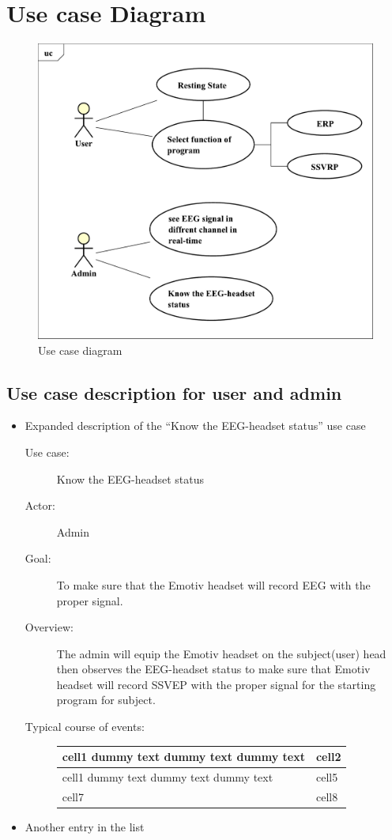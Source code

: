 \section{Use case Diagram}
\begin{figure}[ht]
	\centering
	\includegraphics[scale = 0.5]{chapter4/uc.pdf}
	\caption{Use case diagram}
\end{figure}

\newpage

\subsection{Use case description for user and admin}
\begin{itemize}
	\item Expanded description of the “Know the EEG-headset status” use case
	\begin{description}
		\item [Use case:]Know the EEG-headset status 
		\item [Actor:]Admin 
		\item [Goal:]To make sure that the Emotiv headset will record EEG with the proper signal. 
		\item[Overview:]The admin will equip the Emotiv headset on the subject(user) head then observes the EEG-headset status to make sure that Emotiv headset will record SSVEP with the proper signal for the starting program for subject.	
		\item[Typical course of events:] 
		{
			\begin{tabular}{ | m{7cm}| m{7cm} | } 
				\hline
				cell1 dummy text dummy text dummy text& cell2  \\ 
				\hline
				cell1 dummy text dummy text dummy text & cell5  \\ 
				\hline
				cell7 & cell8  \\ 
				\hline
			\end{tabular}
	}
		
	\end{description}
	\item Another entry in the list
\end{itemize}


